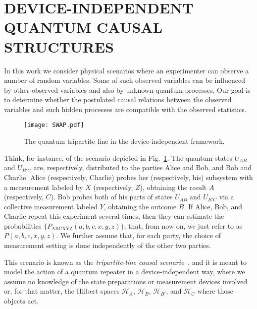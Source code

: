 \documentclass[superscriptaddress,aps,prx,nofootinbib,twocolumn,twoside,reprint,letterpaper,longbibliography]{revtex4-2}
\def\H{{\mathcal H}}
\begin{document}
\section{DEVICE-INDEPENDENT QUANTUM CAUSAL STRUCTURES}\label{sec:structures}
In this work we consider physical scenarios where an experimenter can observe a number of random variables. Some of such observed variables can be influenced by other observed variables and also by unknown quantum processes. Our goal is to determine whether the postulated causal relations between the observed variables and such hidden processes are compatible with the observed statistics.

\begin{figure}[t]
    \centering
   \texttt{[image: SWAP.pdf]}
  \caption{The quantum tripartite line in the device-independent framework.}
  \label{fig:SWAP}
\end{figure}

Think, for instance, of the scenario depicted in Fig.~\ref{fig:SWAP}. The quantum states $U_{AB}$ and $U_{B'C}$ are, respectively, distributed to the parties Alice and Bob, and Bob and Charlie. Alice (respectively, Charlie) probes her (respectively, his) subsystem with a measurement labeled by $X$ (respectively, $Z$), obtaining the result $A$ (respectively, $C$). Bob probes both of his parts of states $U_{AB}$ and $U_{B'C}$ via a collective measurement labeled $Y$, obtaining the outcome $B$. If Alice, Bob, and Charlie repeat this experiment several times, then they can estimate the probabilities ${\{P_{\text{ABCXYZ}}(a,b,c,x,y,z)\}}$, that, from now on, we just refer to as ${P(a,b,c,x,y,z)}$. We further assume that, for each party, the choice of measurement setting is done independently of the other two parties.

This scenario is known as the \emph{tripartite-line causal scenario}~\cite{branciard2010bilocality,branciard2012bilocality}, and it is meant to model the action of a quantum repeater in a device-independent way, where we assume no knowledge of the state preparations or measurement devices involved or, for that matter, the Hilbert spaces $\H_A$, $\H_B$, $\H_{B'}$, and $\H_C$ where those objects act.
\end{document}
